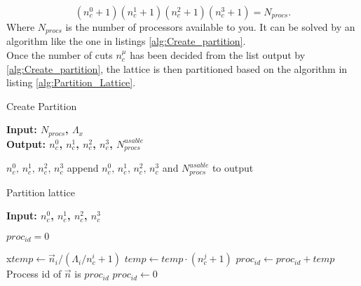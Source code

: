 \documentclass[a4paper,10pt]{book}
\begin{document}
\begin{equation}
(n^0_c+1)(n^1_c+1)(n^2_c+1)(n^3_c+1)= N_{procs}.
\end{equation}
Where $N_{procs}$ is the number of processors available to you. It can be solved by an algorithm like the one in listings \ref{alg:Create_partition}.\\Once the number of cuts $n_c^\mu$ has been decided from the list output by \ref{alg:Create_partition}, the lattice is then partitioned based on the algorithm in listing \ref{alg:Partition_Lattice}.
\begin{algorithm}
\caption{Create Partition}\label{alg:Create_partition}
\hspace*{\algorithmicindent} \textbf{Input: $N_{procs}$, $\Lambda_x$} \\
\hspace*{\algorithmicindent} \textbf{Output: $n^0_c$, $n^1_c$, $n^2_c$, $n^3_c$, $N^{usable}_{procs}$}
\begin{algorithmic}
\State $n^0_c,\,n^1_c,\,n^2_c,\,n^3_c$
\State append $n^0_c,\,n^1_c,\,n^2_c,\,n^3_c$ and $N^{usable}_{procs}$ to output
\EndIf
\EndFor

\end{algorithmic}
\end{algorithm}


\begin{algorithm}
\caption{Partition lattice}\label{alg:Partition_Lattice}
\hspace*{\algorithmicindent} \textbf{Input: $n^0_c$, $n^1_c$, $n^2_c$, $n^3_c$}
\begin{algorithmic}
\Ensure
\State $proc_{id} = 0$

x\State $temp \gets \vec{n}_i/(\Lambda_i/n^i_c+1)$
\State $temp \gets temp\cdot(n^j_c+1)$
\EndFor
\State $proc_{id} \gets proc_{id}+ temp$
\EndFor
\State \Return Process id of $\vec{n}$ is $proc_{id}$
\State $proc_{id}\gets 0$
\EndFor

\end{algorithmic}
\end{algorithm}
\end{document}
